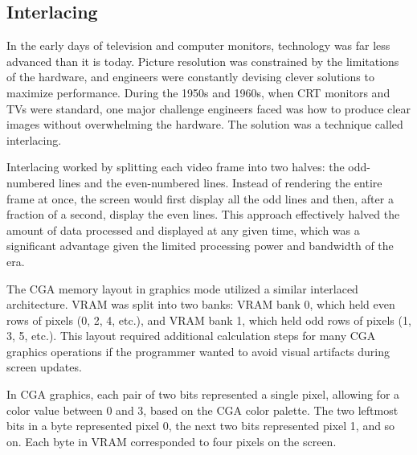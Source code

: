 \documentclass[book.tex]{subfiles}
\begin{document}
\par
\begin{minipage}{\textwidth}
  
\end{minipage}




\subsection{Interlacing}
In the early days of television and computer monitors, technology was far less advanced than it is today. Picture resolution was constrained by the limitations of the hardware, and engineers were constantly devising clever solutions to maximize performance. During the 1950s and 1960s, when CRT monitors and TVs were standard, one major challenge engineers faced was how to produce clear images without overwhelming the hardware. The solution was a technique called interlacing.\\

\par
Interlacing worked by splitting each video frame into two halves: the odd-numbered lines and the even-numbered lines. Instead of rendering the entire frame at once, the screen would first display all the odd lines and then, after a fraction of a second, display the even lines. This approach effectively halved the amount of data processed and displayed at any given time, which was a significant advantage given the limited processing power and bandwidth of the era.\\

\par
The CGA memory layout in graphics mode utilized a similar interlaced architecture. VRAM was split into two banks: VRAM bank 0, which held even rows of pixels (0, 2, 4, etc.), and VRAM bank 1, which held odd rows of pixels (1, 3, 5, etc.). This layout required additional calculation steps for many CGA graphics operations if the programmer wanted to avoid visual artifacts during screen updates.\\

\par
In CGA graphics, each pair of two bits represented a single pixel, allowing for a color value between 0 and 3, based on the CGA color palette. The two leftmost bits in a byte represented pixel 0, the next two bits represented pixel 1, and so on. Each byte in VRAM corresponded to four pixels on the screen.\\
\end{document}
